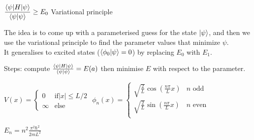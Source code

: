 \begin{squishlist}
    \item $\dfrac{\braket{\psi | H | \psi}}{\braket{\psi|\psi}} \geq E_0$ Variational principle 
    \item The idea is to come up with a parameterised guess for the state $\ket{\psi}$, and then we use the variational principle to find the parameter values that minimize $\psi$.\\
    It generalises to excited states ($\braket{\phi_0|\psi} = 0$) by replacing $E_0$ with $E_1$.
    \item Steps: compute $\frac{\braket{\psi | H | \psi}}{\braket{\psi|\psi}} = E(a)$ then minimise $E$ with respect to the parameter.
\end{squishlist}


\columnbreak

\begin{squishlist}
    
    \item $V(x) = \begin{cases}
        0 & \text{if} |x| \leq L/2 \\ \infty & \text{else}
    \end{cases}$
    \qquad
    $\phi_n(x) = \begin{cases}
        \sqrt{\frac{2}{L}} \cos(\frac{n\pi }{L} x) & n \text{ odd} \\
        \sqrt{\frac{2}{L}} \sin(\frac{n\pi }{L} x) & n \text{ even} \\
    \end{cases}$
    
    \item $E_n = n^2 \frac{\pi^2 \hbar^2}{2 m L^2}$
\end{squishlist}

